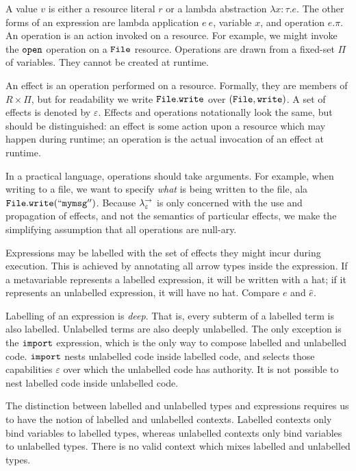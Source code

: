 A value $v$ is either a resource literal $r$ or a lambda abstraction $\lambda x: \tau.e$. The other forms of an expression are lambda application $e~e$, variable $x$, and operation $e.\pi$. An operation is an action invoked on a resource. For example, we might invoke the $\mathtt{open}$ operation on a $\mathtt{File}$ resource. Operations are drawn from a fixed-set $\Pi$ of variables. They cannot be created at runtime.

An effect is an operation performed on a resource. Formally, they are members of $R \times \Pi$, but for readability we write $\mathtt{File.write}$ over $\mathtt{(File, write)}$. A set of effects is denoted by $\varepsilon$. Effects and operations notationally look the same, but should be distinguished: an effect is some action upon a resource which may happen during runtime; an operation is the actual invocation of an effect at runtime.

In a practical language, operations should take arguments. For example, when writing to a file, we want to specify \textit{what} is being written to the file, ala $\mathtt{File.write(``my msg'')}$. Because $\lambda^{\rightarrow}_{\varepsilon}$ is only concerned with the use and propagation of effects, and not the semantics of particular effects, we make the simplifying assumption that all operations are null-ary.

Expressions may be labelled with the set of effects they might incur during execution. This is achieved by annotating all arrow types inside the expression. If a metavariable represents a labelled expression, it will be written with a hat; if it represents an unlabelled expression, it will have no hat. Compare $e$ and $\hat e$.

Labelling of an expression is \textit{deep}. That is, every subterm of a labelled term is also labelled. Unlabelled terms are also deeply unlabelled. The only exception is the $\mathtt{import}$ expression, which is the only way to compose labelled and unlabelled code. $\mathtt{import}$ nests unlabelled code inside labelled code, and selects those capabilities $\varepsilon$ over which the unlabelled code has authority. It is not possible to nest labelled code inside unlabelled code.

The distinction between labelled and unlabelled types and expressions requires us to have the notion of labelled and unlabelled contexts. Labelled contexts only bind variables to labelled types, whereas unlabelled contexts only bind variables to unlabelled types. There is no valid context which mixes labelled and unlabelled types.

